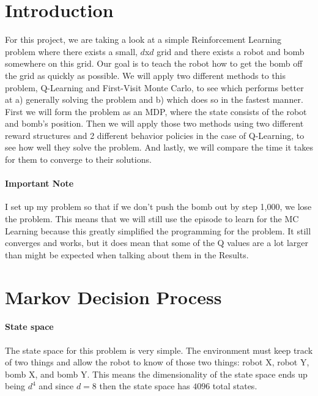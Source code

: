 \documentclass[12pt]{article}
\begin{document}
\maketitle

\section{Introduction}

For this project, we are taking a look at a simple Reinforcement Learning problem where there exists a small, $d$x$d$ grid and there exists a robot and bomb somewhere on this grid. Our goal is to teach the robot how to get the bomb off the grid as quickly as possible. We will apply two different methods to this problem, Q-Learning and First-Visit Monte Carlo, to see which performs better at a) generally solving the problem and b) which does so in the fastest manner. First we will form the problem as an MDP, where the state consists of the robot and bomb's position. Then we will apply those two methods using two different reward structures and 2 different behavior policies in the case of Q-Learning, to see how well they solve the problem. And lastly, we will compare the time it takes for them to converge to their solutions.

\paragraph{Important Note} I set up my problem so that if we don't push the bomb out by step 1,000, we lose the problem. This means that we will still use the episode to learn for the MC Learning because this greatly simplified the programming for the problem. It still converges and works, but it does mean that some of the Q values are a lot larger than might be expected when talking about them in the Results.

\section{Markov Decision Process}

\paragraph{State space} The state space for this problem is very simple. The environment must keep track of two things and allow the robot to know of those two things: robot X, robot Y, bomb X, and bomb Y. This means the dimensionality of the state space ends up being $d^4$ and since $d = 8$ then the state space has $4096$ total states.
\end{document}
